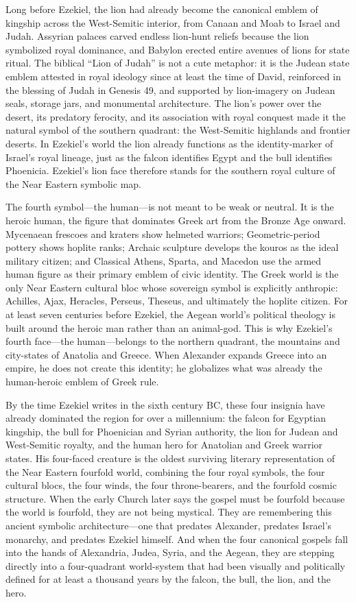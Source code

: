 Long before Ezekiel, the lion had already become the canonical emblem of kingship across the West-Semitic interior, from Canaan and Moab to Israel and Judah.
Assyrian palaces carved endless lion-hunt reliefs because the lion symbolized royal dominance, and Babylon erected entire avenues of lions for state ritual.
The biblical ``Lion of Judah'' is not a cute metaphor: it is the Judean state emblem attested in royal ideology since at least the time of David, reinforced in the blessing of Judah in Genesis 49, and supported by lion-imagery on Judean seals, storage jars, and monumental architecture.
The lion's power over the desert, its predatory ferocity, and its association with royal conquest made it the natural symbol of the southern quadrant: the West-Semitic highlands and frontier deserts.
In Ezekiel's world the lion already functions as the identity-marker of Israel's royal lineage, just as the falcon identifies Egypt and the bull identifies Phoenicia.
Ezekiel's lion face therefore stands for the southern royal culture of the Near Eastern symbolic map.

The fourth symbol---the human---is not meant to be weak or neutral.
It is the heroic human, the figure that dominates Greek art from the Bronze Age onward.
Mycenaean frescoes and kraters show helmeted warriors; Geometric-period pottery shows hoplite ranks; Archaic sculpture develops the kouros as the ideal military citizen; and Classical Athens, Sparta, and Macedon use the armed human figure as their primary emblem of civic identity.
The Greek world is the only Near Eastern cultural bloc whose sovereign symbol is explicitly anthropic: Achilles, Ajax, Heracles, Perseus, Theseus, and ultimately the hoplite citizen.
For at least seven centuries before Ezekiel, the Aegean world's political theology is built around the heroic man rather than an animal-god.
This is why Ezekiel's fourth face---the human---belongs to the northern quadrant, the mountains and city-states of Anatolia and Greece.
When Alexander expands Greece into an empire, he does not create this identity; he globalizes what was already the human-heroic emblem of Greek rule.

By the time Ezekiel writes in the sixth century BC, these four insignia have already dominated the region for over a millennium: the falcon for Egyptian kingship, the bull for Phoenician and Syrian authority, the lion for Judean and West-Semitic royalty, and the human hero for Anatolian and Greek warrior states.
His four-faced creature is the oldest surviving literary representation of the Near Eastern fourfold world, combining the four royal symbols, the four cultural blocs, the four winds, the four throne-bearers, and the fourfold cosmic structure.
When the early Church later says the gospel must be fourfold because the world is fourfold, they are not being mystical.
They are remembering this ancient symbolic architecture---one that predates Alexander, predates Israel's monarchy, and predates Ezekiel himself.
And when the four canonical gospels fall into the hands of Alexandria, Judea, Syria, and the Aegean, they are stepping directly into a four-quadrant world-system that had been visually and politically defined for at least a thousand years by the falcon, the bull, the lion, and the hero.

